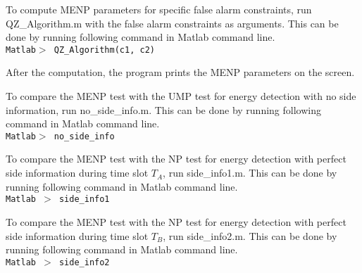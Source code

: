 To compute MENP parameters for specific false alarm constraints, run QZ\_Algorithm.m with the false alarm constraints as arguments. This can be done by running following command in Matlab command line.
\\\texttt{Matlab$>$ QZ\_Algorithm(c1, c2)}

After the computation, the program prints the MENP parameters on the screen. 

To compare the MENP test with the UMP test for energy detection with no side information, run no\_side\_info.m. This can be done by running following command in Matlab command line.
\\\texttt{Matlab$>$ no\_side\_info}

To compare the MENP test with the NP test for energy detection with perfect side information during time slot $T_A$, run side\_info1.m. This can be done by running following command in Matlab command line.
\\\texttt{Matlab $>$ side\_info1}

To compare the MENP test with the NP test for energy detection with perfect side information during time slot $T_B$, run side\_info2.m. This can be done by running following command in Matlab command line.
\\\texttt{Matlab $>$ side\_info2}

